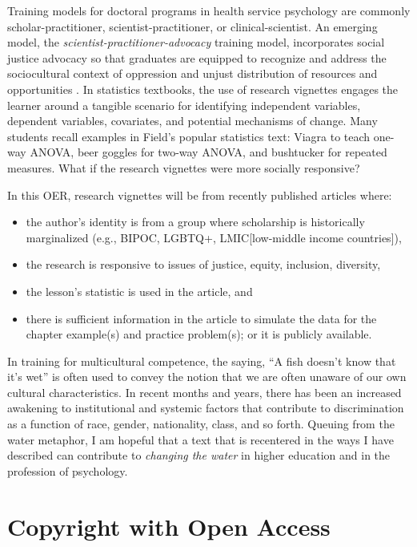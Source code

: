 \documentclass[
  11pt,
]{book}
\providecommand{\tightlist}{%
  \setlength{\itemsep}{0pt}\setlength{\parskip}{0pt}}
\begin{document}
Training models for doctoral programs in health service psychology are commonly scholar-practitioner, scientist-practitioner, or clinical-scientist. An emerging model, the \emph{scientist-practitioner-advocacy} training model, incorporates social justice advocacy so that graduates are equipped to recognize and address the sociocultural context of oppression and unjust distribution of resources and opportunities \citep{mallinckrodt_scientist-practitioner-advocate_2014}. In statistics textbooks, the use of research vignettes engages the learner around a tangible scenario for identifying independent variables, dependent variables, covariates, and potential mechanisms of change. Many students recall examples in Field's \citeyearpar{field_discovering_2012} popular statistics text: Viagra to teach one-way ANOVA, beer goggles for two-way ANOVA, and bushtucker for repeated measures. What if the research vignettes were more socially responsive?

In this OER, research vignettes will be from recently published articles where:

\begin{itemize}
\tightlist
\item
  the author's identity is from a group where scholarship is historically marginalized (e.g., BIPOC, LGBTQ+, LMIC{[}low-middle income countries{]}),
\item
  the research is responsive to issues of justice, equity, inclusion, diversity,
\item
  the lesson's statistic is used in the article, and
\item
  there is sufficient information in the article to simulate the data for the chapter example(s) and practice problem(s); or it is publicly available.
\end{itemize}

In training for multicultural competence, the saying, ``A fish doesn't know that it's wet'' is often used to convey the notion that we are often unaware of our own cultural characteristics. In recent months and years, there has been an increased awakening to institutional and systemic factors that contribute to discrimination as a function of race, gender, nationality, class, and so forth. Queuing from the water metaphor, I am hopeful that a text that is recentered in the ways I have described can contribute to \emph{changing the water} in higher education and in the profession of psychology.

\hypertarget{copyright-with-open-access}{%
\section*{Copyright with Open Access}\label{copyright-with-open-access}}
\end{document}

